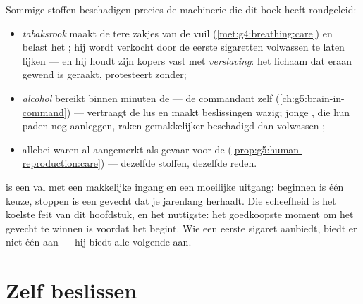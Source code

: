 \begin{proposition}\label{prop:g5:healthy-choices:substances}
Sommige stoffen beschadigen precies de machinerie die dit boek heeft
rondgeleid:
\begin{itemize}
  \item \emph{tabaksrook} maakt de tere zakjes van de  vuil
        (\cref{met:g4:breathing:care}) en belast het ; hij wordt
        verkocht door de eerste sigaretten volwassen te laten lijken ---
        en hij houdt zijn kopers vast met
        \emph{verslaving}: het lichaam dat eraan
        gewend is geraakt, protesteert zonder;
  \item \emph{alcohol} bereikt binnen minuten de  --- de
        commandant zelf
        (\cref{ch:g5:brain-in-command}) --- vertraagt de lus en maakt
        beslissingen wazig; jonge , die hun paden nog aanleggen,
        raken gemakkelijker beschadigd dan volwassen ;
  \item allebei waren al aangemerkt als gevaar voor de 
        (\cref{prop:g5:human-reproduction:care}) --- dezelfde stoffen,
        dezelfde reden.
\end{itemize}
\end{proposition}
\admitted

\begin{remark}\label{rem:g5:healthy-choices:never}
 is een val met een makkelijke ingang en een moeilijke
uitgang: beginnen is één keuze, stoppen is een gevecht dat je jarenlang
herhaalt. Die scheefheid is het koelste feit van dit hoofdstuk, en het
nuttigste: het goedkoopste moment om het gevecht te winnen is voordat het
begint. Wie een eerste sigaret aanbiedt, biedt er niet één aan --- hij
biedt alle volgende aan.
\end{remark}

\section{Zelf beslissen}

